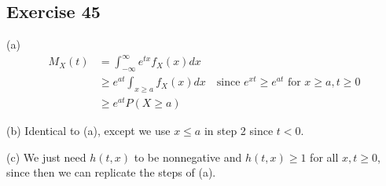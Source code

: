 \subsection{Exercise 45}
(a)
\begin{align*}
        M_X(t) &= \int_{-\infty}^{\infty} e^{tx} f_X(x) dx \\ 
               &\geq e^{at} \int_{x \geq a} f_X(x) dx \quad \text{since } e^{xt} \geq e^{at} \text{ for } x \geq a, t \geq 0 \\
               &\geq e^{at} P(X \geq a)
\end{align*}

(b) Identical to (a), except we use  $x \leq a$ in step 2 since $t < 0$.

(c) We just need $h(t, x)$ to be nonnegative and $h(t, x) \geq 1$ for all $x, t \geq 0$, since then we can
replicate the steps of (a).

